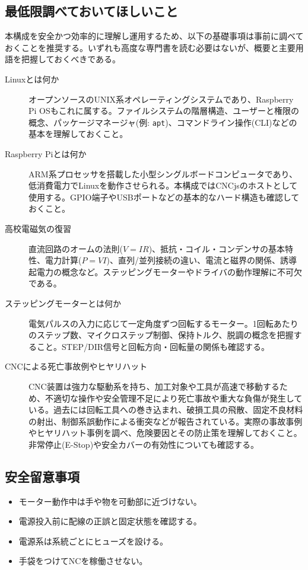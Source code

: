 \documentclass[uplatex,dvipdfmx]{ujarticle}
\begin{document}
\subsection{最低限調べておいてほしいこと}

本構成を安全かつ効率的に理解し運用するため、以下の基礎事項は事前に調べておくことを推奨する。いずれも高度な専門書を読む必要はないが、概要と主要用語を把握しておくべきである。

\begin{description}
  \item[Linuxとは何か]  
    オープンソースのUNIX系オペレーティングシステムであり、Raspberry Pi OSもこれに属する。ファイルシステムの階層構造、ユーザーと権限の概念、パッケージマネージャ(例: \texttt{apt})、コマンドライン操作(CLI)などの基本を理解しておくこと。
  
  \item[Raspberry Piとは何か]  
    ARM系プロセッサを搭載した小型シングルボードコンピュータであり、低消費電力でLinuxを動作させられる。本構成ではCNCjsのホストとして使用する。GPIO端子やUSBポートなどの基本的なハード構造も確認しておくこと。

  \item[高校電磁気の復習]  
    直流回路のオームの法則($V=IR$)、抵抗・コイル・コンデンサの基本特性、電力計算($P=VI$)、直列/並列接続の違い、電流と磁界の関係、誘導起電力の概念など。ステッピングモーターやドライバの動作理解に不可欠である。

  \item[ステッピングモーターとは何か]  
    電気パルスの入力に応じて一定角度ずつ回転するモーター。1回転あたりのステップ数、マイクロステップ制御、保持トルク、脱調の概念を把握すること。STEP/DIR信号と回転方向・回転量の関係も確認する。
  
    \item[CNCによる死亡事故例やヒヤリハット]  
    CNC装置は強力な駆動系を持ち、加工対象や工具が高速で移動するため、不適切な操作や安全管理不足により死亡事故や重大な負傷が発生している。過去には回転工具への巻き込まれ、破損工具の飛散、固定不良材料の射出、制御系誤動作による衝突などが報告されている。実際の事故事例やヒヤリハット事例を調べ、危険要因とその防止策を理解しておくこと。非常停止(E-Stop)や安全カバーの有効性についても確認する。


\end{description}

\subsection{安全留意事項}
\begin{itemize}
    \item モーター動作中は手や物を可動部に近づけない。
    \item 電源投入前に配線の正誤と固定状態を確認する。
    \item 電源系は系統ごとにヒューズを設ける。
    \item 手袋をつけてNCを稼働させない｡
\end{itemize}
\end{document}
